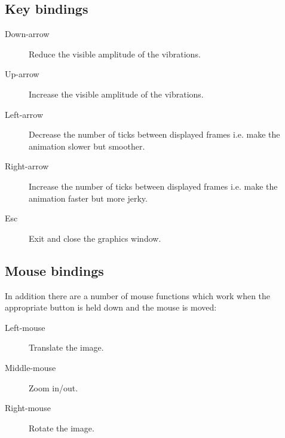 \subsection*{Key bindings}
\label{section:key_and_mouse_bindings}
\begin{description}
\item[Down-arrow] Reduce the visible amplitude of the vibrations.
\item[Up-arrow] Increase the visible amplitude of the vibrations.
\item[Left-arrow] Decrease the number of ticks between displayed frames
i.e. make the animation slower but smoother.
\item[Right-arrow] Increase the number of ticks between displayed frames
i.e. make the animation faster but more jerky.
\item[Esc] Exit and close the graphics window.
\end{description}

\subsection*{Mouse bindings}
In addition there are a number of mouse functions which work when the
appropriate button is held down and the mouse is moved:

\begin{description}
\item[Left-mouse] Translate the image.
\item[Middle-mouse] Zoom in/out.
\item[Right-mouse] Rotate the image.
\end{description}











